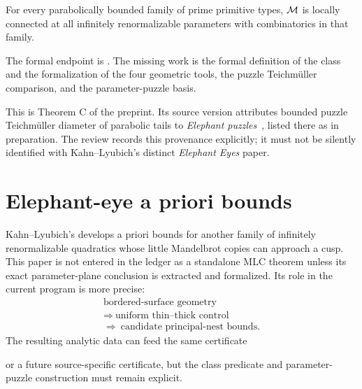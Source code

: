 \begin{theorem}
\label{thm:parabolic-primitive-mlc}
For every parabolically bounded family of prime primitive types,
$\mathcal M$ is locally connected at all infinitely renormalizable parameters
with combinatorics in that family.
\end{theorem}

The formal endpoint is
.  The missing work is the
formal definition of the class and the formalization of the four geometric
tools, the puzzle Teichmüller comparison, and the parameter-puzzle basis.

This is Theorem C of the preprint.  Its source version attributes
bounded puzzle Teichmüller diameter of parabolic tails to
\emph{Elephant puzzles}~\cite{ElephantPuzzles}, listed there as in
preparation.  The review records this provenance explicitly; it must
not be silently identified with Kahn--Lyubich's distinct
\emph{Elephant Eyes} paper.


\section{Elephant-eye a priori bounds}

Kahn--Lyubich's
 develops a priori bounds for another family of
infinitely renormalizable quadratics whose little Mandelbrot copies can
approach a cusp.  This paper is not entered in the ledger as a standalone
MLC theorem unless its exact parameter-plane conclusion is extracted and
formalized.  Its role in the current program is more precise:
\[
\begin{gathered}
\text{bordered-surface geometry}\\
\Longrightarrow\ \text{uniform thin--thick control}\\
\Longrightarrow\ \text{candidate principal-nest bounds}.
\end{gathered}
\]
The resulting analytic data can feed the same certificate
\begin{center}
\end{center}
or a future
source-specific certificate, but the class predicate and parameter-puzzle
construction must remain explicit.

